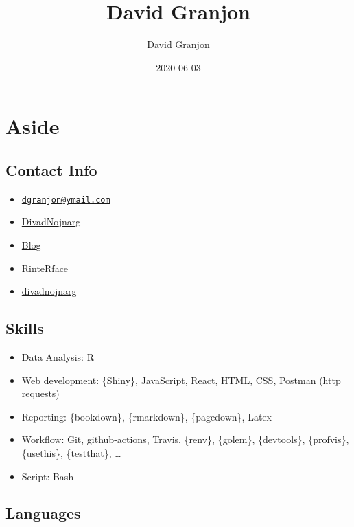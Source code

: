 \documentclass[
]{article}
\title{David Granjon}
\author{David Granjon}
\date{2020-06-03}
\providecommand{\tightlist}{%
  \setlength{\itemsep}{0pt}\setlength{\parskip}{0pt}}
\begin{document}
\maketitle

\hypertarget{aside}{%
\section{Aside}\label{aside}}

\hypertarget{contact}{%
\subsection{Contact Info}\label{contact}}

\begin{itemize}
\tightlist
\item
  \href{mailto:dgranjon@ymail.com}{\nolinkurl{dgranjon@ymail.com}}
\item
  \href{github.com/DivadNojnarg}{DivadNojnarg}
\item
  \href{https://divadnojnarg.github.io}{Blog}
\item
  \href{https://rinterface.com}{RinteRface}
\item
  \href{https://twitter.com/divadnojnarg}{divadnojnarg}
\end{itemize}

\hypertarget{skills}{%
\subsection{Skills}\label{skills}}

\begin{itemize}
\tightlist
\item
  Data Analysis: R
\item
  Web development: \{Shiny\}, JavaScript, React, HTML, CSS, Postman
  (http requests)
\item
  Reporting: \{bookdown\}, \{rmarkdown\}, \{pagedown\}, Latex
\item
  Workflow: Git, github-actions, Travis, \{renv\}, \{golem\},
  \{devtools\}, \{profvis\}, \{usethis\}, \{testthat\}, \ldots{}
\item
  Script: Bash
\end{itemize}

\hypertarget{speak}{%
\subsection{Languages}\label{speak}}
\end{document}
